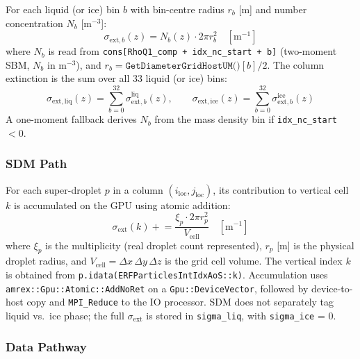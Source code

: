 \documentclass[11pt,letterpaper]{article}
\begin{document}
For each liquid (or ice) bin $b$ with bin-centre radius $r_b$ [$\mathrm{m}$] and number
concentration $N_b$ [$\mathrm{m}^{-3}$]:
\begin{equation}
  \sigma_{\mathrm{ext},b}(z) = N_b(z)\cdot 2\pi r_b^2
  \quad [\mathrm{m}^{-1}]
  \label{eq:sigma_ext_sbm}
\end{equation}
\noindent where $N_b$ is read from
\texttt{cons[RhoQ1\_comp + idx\_nc\_start + b]} (two-moment SBM, $N_b$ in $\mathrm{m}^{-3}$),
and $r_b = \texttt{GetDiameterGridHostUM()}[b] / 2$.
The column extinction is the sum over all 33 liquid (or ice) bins:
\begin{equation}
  \sigma_\mathrm{ext,liq}(z) = \sum_{b=0}^{32}\sigma_{\mathrm{ext},b}^{\mathrm{liq}}(z),
  \qquad
  \sigma_\mathrm{ext,ice}(z) = \sum_{b=0}^{32}\sigma_{\mathrm{ext},b}^{\mathrm{ice}}(z)
\end{equation}
A one-moment fallback derives $N_b$ from the mass density bin if
\texttt{idx\_nc\_start} $< 0$.

\subsubsection{SDM Path}

For each super-droplet $p$ in a column $(i_\mathrm{loc}, j_\mathrm{loc})$, its contribution
to vertical cell $k$ is accumulated on the GPU using atomic addition:
\begin{equation}
  \sigma_\mathrm{ext}(k) \mathrel{+}=
  \frac{\xi_p \cdot 2\pi r_p^2}{V_\mathrm{cell}}
  \quad [\mathrm{m}^{-1}]
  \label{eq:sigma_ext_sdm}
\end{equation}
\noindent where $\xi_p$ is the multiplicity (real droplet count represented),
$r_p$ [$\mathrm{m}$] is the physical droplet radius, and
$V_\mathrm{cell} = \Delta x\,\Delta y\,\Delta z$ is the grid cell volume.
The vertical index $k$ is obtained from \texttt{p.idata(ERFParticlesIntIdxAoS::k)}.
Accumulation uses \texttt{amrex::Gpu::Atomic::AddNoRet} on a \texttt{Gpu::DeviceVector},
followed by device-to-host copy and \texttt{MPI\_Reduce} to the IO processor.
SDM does not separately tag liquid vs.\ ice phase; the full $\sigma_\mathrm{ext}$
is stored in \texttt{sigma\_liq}, with \texttt{sigma\_ice} = 0.

\subsubsection{Data Pathway}
\end{document}
